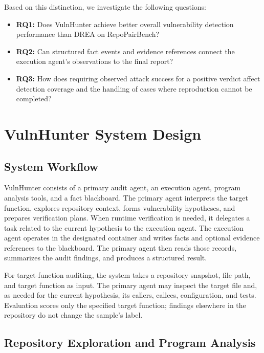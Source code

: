 \documentclass[10pt,a4paper]{article}
\begin{document}
Based on this distinction, we investigate the following questions:

\begin{itemize}
\item \textbf{RQ1:} Does VulnHunter achieve better overall vulnerability detection performance than DREA on RepoPairBench?
\item \textbf{RQ2:} Can structured fact events and evidence references connect the execution agent's observations to the final report?
\item \textbf{RQ3:} How does requiring observed attack success for a positive verdict affect detection coverage and the handling of cases where reproduction cannot be completed?
\end{itemize}

\section{VulnHunter System Design}

\subsection{System Workflow}

VulnHunter consists of a primary audit agent, an execution agent, program analysis tools, and a fact blackboard. The primary agent interprets the target function, explores repository context, forms vulnerability hypotheses, and prepares verification plans. When runtime verification is needed, it delegates a task related to the current hypothesis to the execution agent. The execution agent operates in the designated container and writes facts and optional evidence references to the blackboard. The primary agent then reads those records, summarizes the audit findings, and produces a structured result.

For target-function auditing, the system takes a repository snapshot, file path, and target function as input. The primary agent may inspect the target file and, as needed for the current hypothesis, its callers, callees, configuration, and tests. Evaluation scores only the specified target function; findings elsewhere in the repository do not change the sample's label.

\subsection{Repository Exploration and Program Analysis}
\end{document}
